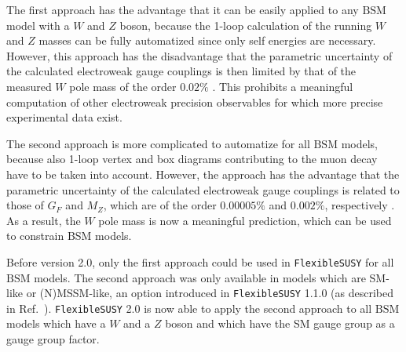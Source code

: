 \documentclass[final,3p,11pt,pdflatex]{elsarticle}
\makeatletter
\newcommand{\fs}{\texttt{FlexibleSUSY}\@\xspace}
\newcommand{\fstwo}{\fs 2.0\@\xspace}
\newcommand{\BSM}{\ensuremath{\text{BSM}}\xspace}
\makeatother
\begin{document}
%
The first approach has the advantage that it can be easily applied to
any \BSM model with a $W$ and $Z$ boson, because the 1-loop calculation of
the running $W$ and $Z$ masses can be fully automatized since only
self energies are necessary.  However, this approach has the
disadvantage that the parametric uncertainty of the calculated
electroweak gauge couplings is then limited by that
of the measured $W$ pole mass of the order $0.02\%$ \cite{Olive:2016xmw}.
This prohibits a meaningful computation of other electroweak precision
observables for which more precise experimental data exist.

The second approach is more complicated to automatize for all \BSM
models, because also 1-loop vertex and box diagrams contributing to
the muon decay have to be taken into account.  However, the approach
has the advantage that the parametric uncertainty of the calculated
electroweak gauge couplings is related to those
of $G_F$ and $M_Z$, which are of the order $0.00005\%$
and $0.002\%$, respectively \cite{Olive:2016xmw}. As a result, the $W$
pole mass is now a meaningful prediction, which can be used to
constrain BSM models.

Before version 2.0, only the first approach could be used in \fs for
all \BSM models.  The second approach was only available in models
which are SM-like or (N)MSSM-like, an option introduced in \fs 1.1.0 (as described in Ref.\ \cite{Staub:2015aea}).
\fstwo is now able to apply the second approach to all \BSM models
which have a $W$ and a $Z$ boson and which have the SM gauge
group as a gauge group factor.
\end{document}
